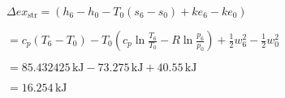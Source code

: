 \( \Delta ex_{\text{str}} = (h_6 - h_0 - T_0 (s_6 - s_0) + ke_6 - ke_0) \)  

\( = c_p (T_6 - T_0) - T_0 \left( c_p \ln \frac{T_6}{T_0} - R \ln \frac{p_6}{p_0} \right) + \frac{1}{2} w_6^2 - \frac{1}{2} w_0^2 \)  

\( = 85.432425 \, \text{kJ} - 73.275 \, \text{kJ} + 40.55 \, \text{kJ} \)  

\( = 16.254 \, \text{kJ} \)